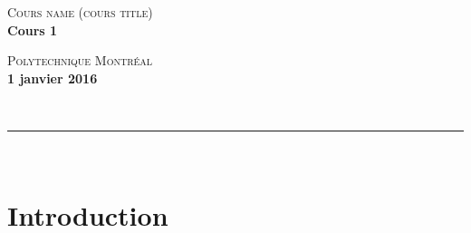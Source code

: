 \documentclass[letterpaper,12pt,oneside]{article}
\newcommand{\HRule}{\rule{\linewidth}{0.5mm}}
\begin{document}
\thispagestyle{empty}


    \begin{minipage}{0.5\textwidth}
        \begin{flushleft}
            \small{\textsc{Cours name (cours title)}}\\[0.2cm]
             {\large \bfseries Cours 1}\\ %
        \end{flushleft}
    \end{minipage}
    \begin{minipage}{0.5\textwidth}
        \begin{flushright}
            \small{\textsc{Polytechnique Montréal}}\\[0.3cm] %
            {\large \bfseries 1 janvier 2016}\\ %
        \end{flushright}
    \end{minipage}\\ [0.2cm]
    \HRule\\

    
\tableofcontents

\setcounter{page}{1}

\section{Introduction}
\end{document}
